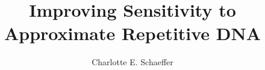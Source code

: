 \documentclass[cs, msthesis, isproposal]{usuthesis}
\title{Improving Sensitivity to Approximate Repetitive DNA}
\author{Charlotte E. Schaeffer}
\begin{document}
\doublespacing





\clearpage


\end{document}
